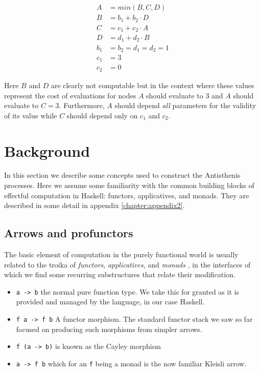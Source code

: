 \begin{align*}
A &= min(B, C, D) \\
B &= b_1 + b_2 \cdot D \\
C &= c_1 + c_2 \cdot A \\
D &= d_1 + d_2 \cdot B \\
b_1 &= b_2 = d_1 = d_2 = 1 \\
c_1 &= 3 \\
c_2 &= 0
\end{align*}

Here \(B\) and \(D\) are clearly not computable but in the context
where these values represent the cost of evaluations for nodes \(A\)
should evaluate to 3 and \(A\) should evaluate to \(C =
3\). Furthermore, \(A\) should depend \emph{all} parameters for the
validity of its value while \(C\) should depend only on \(c_1\) and
\(c_2\).


\section{Background}

In this section we describe some concepts used to construct the
Antisthenis processes. Here we assume some familiarity with the
common building blocks of effectful computation in Haskell: functors,
applicatives, and monads. They are described in some detail in
appendix \ref{chapter:appendix2}.

\subsection{Arrows and profunctors}

The basic element of computation in the purely functional world is
usually related to the troika of \emph{functors}, \emph{applicatives},
and \emph{monads} \cite{yorgeyTypeclassopedia2009}, in the interfaces
of which we find some recurring substructures that relate their
modification.

\begin{itemize}
\item \texttt{a -> b} the normal pure function type. We take this for granted as
it is provided and managed by the language, in our case Haskell.
\item \texttt{f a -> f b} A functor morphism. The standard functor stack we saw
so far focused on producing such morphisms from simpler arrows.
\item \texttt{f (a -> b)} is known as the Cayley morphism
\item \texttt{a -> f b} which for an \texttt{f} being a monad is the now familiar
Kleisli arrow.
\end{itemize}

